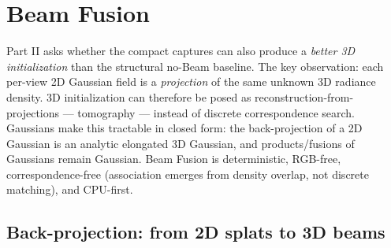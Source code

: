 \section{Beam Fusion}
\label{sec:beam-fusion}

Part II asks whether the compact captures can also produce a \emph{better 3D initialization}
than the structural no-Beam baseline.  The key observation: each per-view 2D Gaussian field is
a \emph{projection} of the same unknown 3D radiance density.  3D initialization can therefore
be posed as reconstruction-from-projections --- tomography --- instead of discrete
correspondence search.  Gaussians make this tractable in closed form: the back-projection of a
2D Gaussian is an analytic elongated 3D Gaussian, and products/fusions of Gaussians remain
Gaussian.  Beam Fusion is deterministic, RGB-free, correspondence-free (association emerges
from density overlap, not discrete matching), and CPU-first.

\subsection{Back-projection: from 2D splats to 3D beams}
\label{sec:beams}

